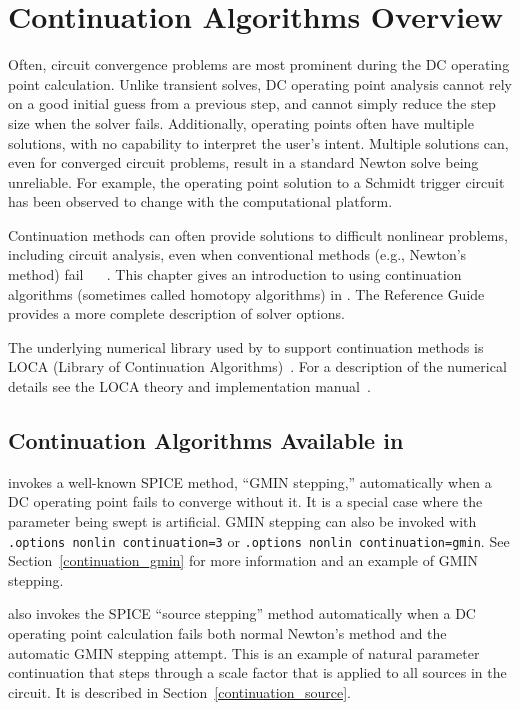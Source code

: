 \section{Continuation Algorithms Overview}

\label{continuation_Overview}

Often, circuit convergence problems are most prominent during the DC operating
point calculation. Unlike transient solves, DC operating point analysis cannot
rely on a good initial guess from a previous step, and cannot simply reduce the
step size when the solver fails. Additionally, operating points often have
multiple solutions, with no capability to interpret the user's intent. Multiple
solutions can, even for converged circuit problems, result in a standard Newton
solve being unreliable. For example, the operating point solution to a Schmidt
trigger circuit has been observed to change with the computational platform.

Continuation methods can often provide solutions to difficult nonlinear problems,
including circuit analysis, even when conventional methods (e.g., Newton's
method) fail ~\cite{Melville:1990} ~\cite{Melville:1993}.  This chapter gives
an introduction to using continuation algorithms (sometimes called homotopy 
algorithms) in \Xyce{}. The \Xyce{} Reference Guide\ReferenceGuide{} provides a
more complete description of solver options.

The underlying numerical library used by \Xyce{} to support continuation methods
is LOCA (Library of Continuation Algorithms)~\cite{loca,loca2}.  For a description 
of the numerical details see the LOCA theory and implementation 
manual~\cite{locaManual}.

\subsection{Continuation Algorithms Available in \Xyce{}}

\Xyce{} invokes a well-known SPICE method, ``GMIN stepping,'' automatically
when a DC operating point fails to converge without it.  It is a special case
where the parameter being swept is artificial.  GMIN stepping can also be
invoked with \texttt{.options nonlin continuation=3} or \texttt{.options nonlin
continuation=gmin}. See Section~\ref{continuation_gmin} for more information and an
example of GMIN stepping.

\Xyce{} also invokes the SPICE ``source stepping'' method automatically when a DC operating point calculation fails both normal Newton's method and the automatic GMIN stepping attempt.  This is an example of natural parameter continuation that steps through a scale factor that is applied to all sources in the circuit.  It is described in Section~\ref{continuation_source}.

